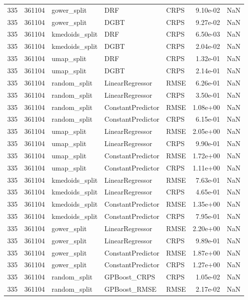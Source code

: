 \begin{tabular}{rrlllrr}
335 & 361104 & gower\_split & DRF & CRPS & 9.10e-02 & NaN \\
335 & 361104 & gower\_split & DGBT & CRPS & 9.27e-02 & NaN \\
335 & 361104 & kmedoids\_split & DRF & CRPS & 6.50e-03 & NaN \\
335 & 361104 & kmedoids\_split & DGBT & CRPS & 2.04e-02 & NaN \\
335 & 361104 & umap\_split & DRF & CRPS & 1.32e-01 & NaN \\
335 & 361104 & umap\_split & DGBT & CRPS & 2.14e-01 & NaN \\
335 & 361104 & random\_split & LinearRegressor & RMSE & 6.26e-01 & NaN \\
335 & 361104 & random\_split & LinearRegressor & CRPS & 3.50e-01 & NaN \\
335 & 361104 & random\_split & ConstantPredictor & RMSE & 1.08e+00 & NaN \\
335 & 361104 & random\_split & ConstantPredictor & CRPS & 6.15e-01 & NaN \\
335 & 361104 & umap\_split & LinearRegressor & RMSE & 2.05e+00 & NaN \\
335 & 361104 & umap\_split & LinearRegressor & CRPS & 9.90e-01 & NaN \\
335 & 361104 & umap\_split & ConstantPredictor & RMSE & 1.72e+00 & NaN \\
335 & 361104 & umap\_split & ConstantPredictor & CRPS & 1.11e+00 & NaN \\
335 & 361104 & kmedoids\_split & LinearRegressor & RMSE & 7.63e-01 & NaN \\
335 & 361104 & kmedoids\_split & LinearRegressor & CRPS & 4.65e-01 & NaN \\
335 & 361104 & kmedoids\_split & ConstantPredictor & RMSE & 1.35e+00 & NaN \\
335 & 361104 & kmedoids\_split & ConstantPredictor & CRPS & 7.95e-01 & NaN \\
335 & 361104 & gower\_split & LinearRegressor & RMSE & 2.20e+00 & NaN \\
335 & 361104 & gower\_split & LinearRegressor & CRPS & 9.89e-01 & NaN \\
335 & 361104 & gower\_split & ConstantPredictor & RMSE & 1.87e+00 & NaN \\
335 & 361104 & gower\_split & ConstantPredictor & CRPS & 1.27e+00 & NaN \\
335 & 361104 & random\_split & GPBoost\_CRPS & CRPS & 1.05e-02 & NaN \\
335 & 361104 & random\_split & GPBoost\_RMSE & RMSE & 2.17e-02 & NaN \\

\end{tabular}
